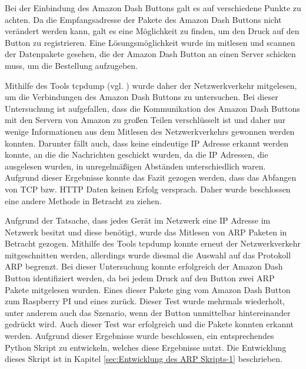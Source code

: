 Bei der Einbindung des Amazon Dash Buttons galt es auf verschiedene Punkte zu achten. 
Da die Empfangsadresse der Pakete des Amazon Dash Buttons nicht verändert werden kann, galt es eine Möglichkeit zu finden, um den Druck auf den Button zu registrieren.
Eine Lösungsmöglichkeit wurde im mitlesen und scannen der Datenpakete gesehen, die der Amazon Dash Button an einen Server schicken muss, um die Bestellung aufzugeben.

Mithilfe des Tools tcpdump (vgl. \cite{.tcpdump}) wurde daher der Netzwerkverkehr mitgelesen, um die Verbindungen des Amazon Dash Buttons zu untersuchen. 
Bei dieser Untersuchung ist aufgefallen, dass die Kommunikation des Amazon Dash Buttons mit den Servern von Amazon zu großen Teilen verschlüsselt ist und daher nur wenige Informationen aus dem Mitlesen des Netzwerkverkehrs gewonnen werden konnten. 
Darunter fällt auch, dass keine eindeutige \ac{IP} Adresse erkannt werden konnte, an die die Nachrichten geschickt wurden, da die \ac{IP} Adressen, die ausgelesen wurden, in unregelmäßigen Abständen unterschiedlich waren.
Aufgrund dieser Ergebnisse konnte das Fazit gezogen werden, dass das Abfangen von \ac{TCP} bzw. \ac{HTTP} Daten keinen Erfolg versprach.
Daher wurde beschlossen eine andere Methode in Betracht zu ziehen.

Aufgrund der Tatsache, dass jedes Gerät im Netzwerk eine \ac{IP} Adresse im Netzwerk besitzt und diese benötigt, wurde das Mitlesen von \ac{ARP} Paketen in Betracht gezogen.
Mithilfe des Tools tcpdump konnte erneut der Netzwerkverkehr mitgeschnitten werden, allerdings wurde diesmal die Auswahl auf das Protokoll \ac{ARP} begrenzt. 
Bei dieser Untersuchung konnte erfolgreich der Amazon Dash Button identifiziert werden, da bei jedem Druck auf den Button zwei \ac{ARP} Pakete mitgelesen wurden.
Eines dieser Pakete ging vom Amazon Dash Button zum Raspberry PI und eines zurück. 
Dieser Test wurde mehrmals wiederholt, unter anderem auch das Szenario, wenn der Button unmittelbar hintereinander gedrückt wird. 
Auch dieser Test war erfolgreich und die Pakete konnten erkannt werden.
Aufgrund dieser Ergebnisse wurde beschlossen, ein entsprechendes Python Skript zu entwickeln, welches diese Ergebnisse nutzt.
Die Entwicklung dieses Skript ist in Kapitel \ref{sec:Entwicklung des ARP Skripts-1} beschrieben. 